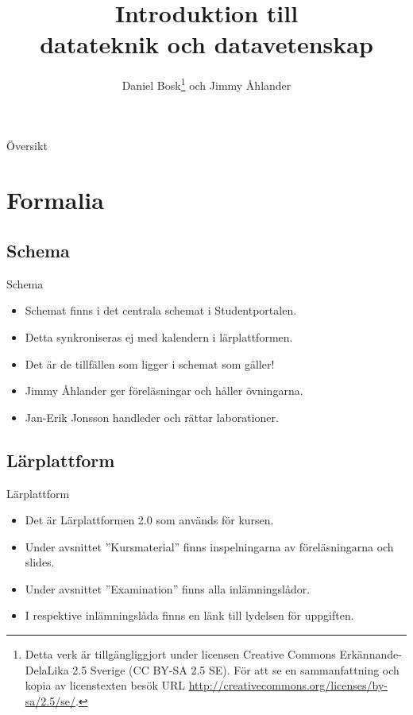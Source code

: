 \documentclass{beamer}
\title[Introduktion]{%
  Introduktion till \\
  datateknik och datavetenskap
}
\author{Daniel Bosk\footnote{%
    \tiny
    Detta verk är tillgängliggjort under licensen Creative Commons 
    Erkännande-DelaLika 2.5 Sverige (CC BY-SA 2.5 SE).
    För att se en sammanfattning och kopia av licenstexten besök URL 
    \url{http://creativecommons.org/licenses/by-sa/2.5/se/}.
  } och
  Jimmy Åhlander
}
\institute[MIUN IKS]{%
  Avdelningen för informations- och kommunikationssytem,\\
  Mittuniversitetet, SE-851\,70 Sundsvall.
}
\date{\svnId}
\begin{document}
\begin{frame}
  \titlepage
\end{frame}

\begin{frame}{Översikt}
	\tableofcontents
\end{frame}





\section{Formalia}

\subsection{Schema}
\begin{frame}{Schema}
  \begin{itemize}
    \item Schemat finns i det centrala schemat i Studentportalen.
    \item Detta synkroniseras ej med kalendern i lärplattformen.
    \item Det är de tillfällen som ligger i schemat som gäller!
  \end{itemize}
  \begin{itemize}
    \item Jimmy Åhlander ger föreläsningar och håller övningarna. 
    \item Jan-Erik Jonsson handleder och rättar laborationer.
  \end{itemize}
\end{frame}

\subsection{Lärplattform}
\begin{frame}{Lärplattform}
  \begin{itemize}
    \item Det är Lärplattformen 2.0 som används för kursen.
    \item Under avsnittet ''Kursmaterial'' finns inspelningarna av 
      föreläsningarna och slides.
    \item Under avsnittet ''Examination'' finns alla inlämningslådor.
    \item I respektive inlämningslåda finns en länk till lydelsen för 
      uppgiften.
  \end{itemize}
\end{frame}
\end{document}
